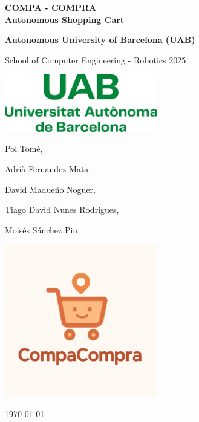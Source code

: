 \documentclass[a4paper,12pt]{article}
\begin{document}
\begin{titlepage}
    \centering
    \vspace*{2cm}

    {\Huge\bfseries COMPA - COMPRA  \\ \Large{Autonomous Shopping Cart} \par}

    \vspace{1cm}
    {\Large\bfseries Autonomous University of Barcelona (UAB)

    School of Computer Engineering - Robotics 2025 \par}

    \vspace{0.5cm}

    \includegraphics[width=0.5\textwidth]{Logo_uab.png} %

    \vspace{0.5cm}
    {\large Pol Tomé,

    Adrià Fernandez Mata,

    David Madueño Noguer,

    Tiago David Nunes Rodrigues,

    Moisés Sánchez Pin
     \par}

    \vspace{1cm}
    \includegraphics[width=0.5\textwidth]{compacompra_logo.jpg} %

    \vfill
    {\Large \today} %

\end{titlepage}
\end{document}
